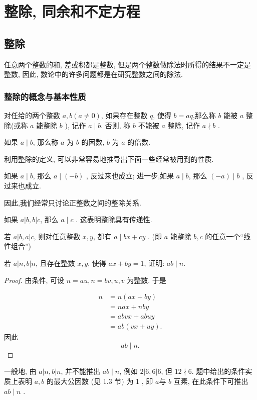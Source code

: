 \chapter{整除, 同余和不定方程}
\section{整除}
任意两个整数的和, 差或积都是整数, 但是两个整数做除法时所得的结果不一定是整数, 因此, 数论中的许多问题都是在研究整数之间的除法.

\subsection{整除的概念与基本性质}
\begin{definition}
	对任给的两个整数 $a ,  b(a \neq 0)$, 如果存在整数 $q$, 使得 $b=a q$,那么称 $b$ 能被 $a$ 整除(或称 $a$ 能整除 $b$ ), 记作 $a \mid b$. 否则, 称 $b$ 不能被 $a$ 整除, 记作 $a \nmid b$ .

	如果 $a \mid b$, 那么称 $a$ 为 $b$ 的因数, $b$ 为 $a$ 的倍数.
\end{definition}

利用整除的定义, 可以非常容易地推导出下面一些经常被用到的性质.

\begin{property}
	如果 $a \mid b$, 那么 $a \mid(-b)$ , 反过来也成立; 进一步,如果 $a \mid b$, 那么 $(-a) \mid b$ , 反过来也成立.
\end{property}

因此,我们经常只讨论正整数之间的整除关系.

\begin{property}
	如果 $a|b, b| c$, 那么 $a \mid c$ . 这表明整除具有传递性.
\end{property}

\begin{property}
	若 $a|b, a| c$, 则对任意整数 $x ,  y$, 都有 $a \mid b x+c y$ . (即 $a$ 能整除 $b ,  c$ 的任意一个“线性组合”)
\end{property}

\begin{example}
	若 $a|n, b| n$, 且存在整数 $x ,  y$, 使得 $a x+b y=1$, 证明: $a b \mid n$.
\end{example}
\begin{proof}
	由条件, 可设 $n=a u, n=b v, u ,  v$ 为整数. 于是
	
\begin{align*}
		n & =n(a x+b y)      \\
		  & =n a x+n b y     \\
		  & =a b v x+a b u y \\
		  & =a b(v x+u y).
	\end{align*}
	因此
	\begin{equation*}
		a b \mid n.
	\end{equation*}
\end{proof}
\begin{note}
	一般地, 由 $a|n, b| n$, 并不能推出 $a b \mid n$, 例如 $2|6,6| 6$, 但 $12 \nmid 6$. 题中给出的条件实质上表明 $a ,  b$ 的最大公因数 (见 1.3 节) 为 1 , 即 $a$与 $b$ 互素, 在此条件下可推出 $a b \mid n$ .
\end{note}

